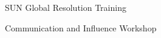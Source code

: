 \documentclass[10pt]{article}
\renewcommand{\section}[2]%
        {\pagebreak[2]\vspace{1.4\baselineskip}%
         \phantomsection\addcontentsline{toc}{section}{#1}%
         \hspace{0in}%
         \marginpar{
         \raggedright \scshape #1}#2}
\newenvironment{innerlist}[1][\enskip\textbullet]%
        {\begin{compactitem}[#1]}{\end{compactitem}}
\newcommand{\blankline}{\quad\pagebreak[2]}
\begin{document}
\blankline

\begin{innerlist}
\item SUN Global Resolution Training
\item Communication and Influence Workshop
\end{innerlist}


\vfill
\end{document}
